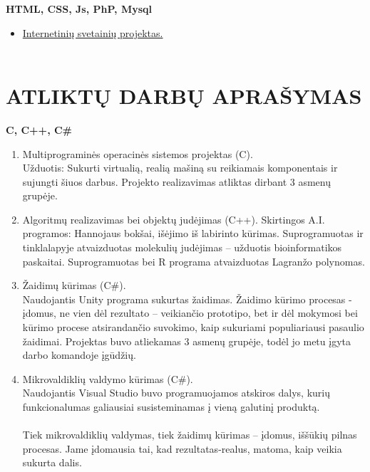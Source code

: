 \documentclass[a4paper,12pt]{article}
\begin{document}
\textbf{HTML, CSS, Js, PhP, Mysql}
\begin{itemize}
	\item 	\href{https://github.com/Luksys5/LT_programos/tree/Tinklapiai}{Internetinių svetainių projektas.}\\\\ 
\end{itemize}

\clearpage

\section{ATLIKTŲ DARBŲ APRAŠYMAS}

\textbf{C, C++, C\#}
\begin{enumerate}
	\item Multiprograminės operacinės sistemos projektas (C). \\
	Užduotis: Sukurti virtualią, realią mašiną su reikiamais komponentais ir sujungti šiuos darbus. Projekto realizavimas atliktas dirbant 3 asmenų grupėje. 
	
	\item Algoritmų realizavimas bei objektų judėjimas (C++). 
	Skirtingos A.I. programos: Hannojaus bokšai, išėjimo iš labirinto kūrimas.
Suprogramuotas ir tinklalapyje atvaizduotas molekulių judėjimas – užduotis bioinformatikos paskaitai.
Suprogramuotas bei R programa atvaizduotas Lagranžo polynomas.
	\item Žaidimų kūrimas (C\#).\\
	Naudojantis Unity programa sukurtas žaidimas. 
Žaidimo kūrimo procesas - įdomus, ne vien dėl rezultato – veikiančio prototipo, bet ir dėl mokymosi bei kūrimo procese atsirandančio suvokimo, kaip sukuriami populiariausi pasaulio žaidimai.  
Projektas buvo atliekamas 3 asmenų grupėje, todėl jo metu įgyta darbo komandoje įgūdžių.
	\item Mikrovaldiklių valdymo kūrimas (C\#).\\
	Naudojantis Visual Studio buvo programuojamos atskiros dalys, kurių funkcionalumas galiausiai susisteminamas į vieną galutinį produktą. \\\\
Tiek mikrovaldiklių valdymas, tiek žaidimų kūrimas – įdomus, iššūkių pilnas procesas. Jame įdomausia tai, kad rezultatas-realus, matoma, kaip veikia sukurta dalis.\\\\

\end{enumerate}
\end{document}
